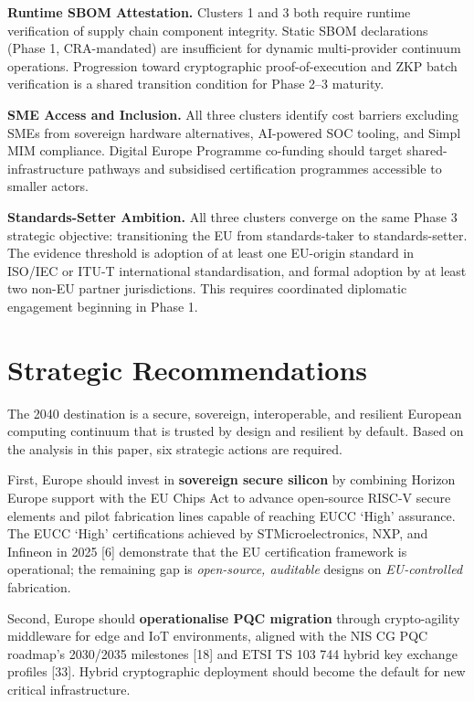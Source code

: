 \documentclass{ieeeaccess}
\begin{document}
\textbf{Runtime SBOM Attestation.} Clusters 1 and 3 both require runtime
verification of supply chain component integrity. Static SBOM
declarations (Phase 1, CRA-mandated) are insufficient for dynamic
multi-provider continuum operations. Progression toward cryptographic
proof-of-execution and ZKP batch verification is a shared transition
condition for Phase 2--3 maturity.

\textbf{SME Access and Inclusion.} All three clusters identify cost
barriers excluding SMEs from sovereign hardware alternatives, AI-powered
SOC tooling, and Simpl MIM compliance. Digital Europe Programme
co-funding should target shared-infrastructure pathways and subsidised
certification programmes accessible to smaller actors.

\textbf{Standards-Setter Ambition.} All three clusters converge on the
same Phase 3 strategic objective: transitioning the EU from
standards-taker to standards-setter. The evidence threshold is adoption
of at least one EU-origin standard in ISO/IEC or ITU-T international
standardisation, and formal adoption by at least two non-EU partner
jurisdictions. This requires coordinated diplomatic engagement beginning
in Phase 1.

\section{Strategic Recommendations}\label{strategic-recommendations}

The 2040 destination is a secure, sovereign, interoperable, and
resilient European computing continuum that is trusted by design and
resilient by default. Based on the analysis in this paper, six strategic
actions are required.

First, Europe should invest in \textbf{sovereign secure silicon} by
combining Horizon Europe support with the EU Chips Act to advance
open-source RISC-V secure elements and pilot fabrication lines capable
of reaching EUCC `High' assurance. The EUCC `High' certifications
achieved by STMicroelectronics, NXP, and Infineon in 2025 {[}6{]}
demonstrate that the EU certification framework is operational; the
remaining gap is \emph{open-source, auditable} designs on
\emph{EU-controlled} fabrication.

Second, Europe should \textbf{operationalise PQC migration} through
crypto-agility middleware for edge and IoT environments, aligned with
the NIS CG PQC roadmap's 2030/2035 milestones {[}18{]} and ETSI TS 103
744 hybrid key exchange profiles {[}33{]}. Hybrid cryptographic
deployment should become the default for new critical infrastructure.
\end{document}
